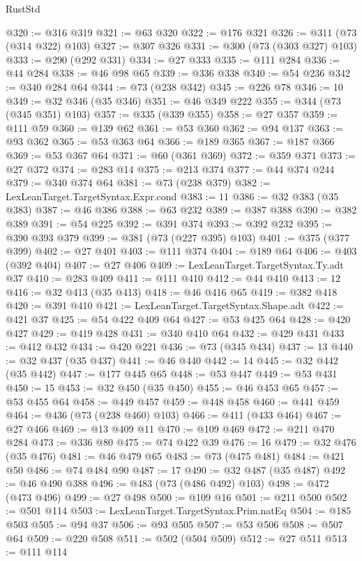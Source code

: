 \begin{lexlean}{RustStd}
\begin{coremodule}
@320 := @316 @319
@321 := @63 @320
@322 := @176 @321
@326 := @311 (@73 (@314 @322) @103)
@327 := @307 @326
@331 := @300 (@73 (@303 @327) @103)
@333 := @290 (@292 @331)
@334 := @27 @333
@335 := @111 @284
@336 := @44 @284
@338 := @46 @98 @65
@339 := @336 @338
@340 := @54 @236
@342 := @340 @284 @64
@344 := @73 (@238 @342)
@345 := @226 @78
@346 := 10
@349 := @32 @346 (@35 @346)
@351 := @46 @349 @222
@355 := @344 (@73 (@345 @351) @103)
@357 := @335 (@339 @355)
@358 := @27 @357
@359 := @111 @59
@360 := @139 @62
@361 := @53 @360
@362 := @94 @137
@363 := @93 @362
@365 := @53 @363 @64
@366 := @189 @365
@367 := @187 @366
@369 := @53 @367 @64
@371 := @60 (@361 @369)
@372 := @359 @371
@373 := @27 @372
@374 := @283 @14
@375 := @213 @374
@377 := @44 @374 @244
@379 := @340 @374 @64
@381 := @73 (@238 @379)
@382 := LexLeanTarget.TargetSyntax.Expr.cond
@383 := 11
@386 := @32 @383 (@35 @383)
@387 := @46 @386
@388 := @63 @232
@389 := @387 @388
@390 := @382 @389
@391 := @54 @225
@392 := @391 @374
@393 := @392 @232
@395 := @390 @393 @379
@399 := @381 (@73 (@227 @395) @103)
@401 := @375 (@377 @399)
@402 := @27 @401
@403 := @111 @374
@404 := @189 @64
@406 := @403 (@392 @404)
@407 := @27 @406
@409 := LexLeanTarget.TargetSyntax.Ty.adt @37
@410 := @283 @409
@411 := @111 @410
@412 := @44 @410
@413 := 12
@416 := @32 @413 (@35 @413)
@418 := @46 @416 @65
@419 := @382 @418
@420 := @391 @410
@421 := LexLeanTarget.TargetSyntax.Shape.adt
@422 := @421 @37
@425 := @54 @422 @409 @64
@427 := @53 @425 @64
@428 := @420 @427
@429 := @419 @428
@431 := @340 @410 @64
@432 := @429 @431
@433 := @412 @432
@434 := @420 @221
@436 := @73 (@345 @434)
@437 := 13
@440 := @32 @437 (@35 @437)
@441 := @46 @440
@442 := 14
@445 := @32 @442 (@35 @442)
@447 := @177 @445 @65
@448 := @53 @447
@449 := @53 @431
@450 := 15
@453 := @32 @450 (@35 @450)
@455 := @46 @453 @65
@457 := @53 @455 @64
@458 := @449 @457
@459 := @448 @458
@460 := @441 @459
@464 := @436 (@73 (@238 @460) @103)
@466 := @411 (@433 @464)
@467 := @27 @466
@469 := @13 @409 @11
@470 := @109 @469
@472 := @211 @470 @284
@473 := @336 @80
@475 := @74 @422 @39
@476 := 16
@479 := @32 @476 (@35 @476)
@481 := @46 @479 @65
@483 := @73 (@475 @481)
@484 := @421 @50
@486 := @74 @484 @90
@487 := 17
@490 := @32 @487 (@35 @487)
@492 := @46 @490 @388
@496 := @483 (@73 (@486 @492) @103)
@498 := @472 (@473 @496)
@499 := @27 @498
@500 := @109 @16
@501 := @211 @500
@502 := @501 @114
@503 := LexLeanTarget.TargetSyntax.Prim.natEq
@504 := @185 @503
@505 := @94 @37
@506 := @93 @505
@507 := @53 @506
@508 := @507 @64
@509 := @220 @508
@511 := @502 (@504 @509)
@512 := @27 @511
@513 := @111 @114

\end{coremodule}
\end{lexlean}
